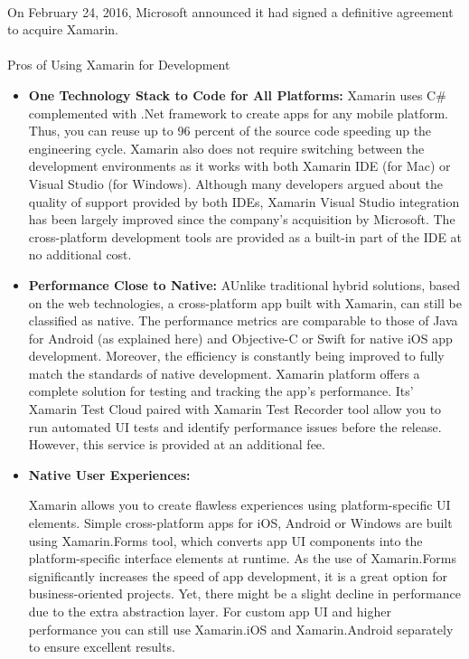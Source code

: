 \paragraph{}
On February 24, 2016, Microsoft announced it had signed a definitive agreement to acquire Xamarin.

\paragraph{}
Pros of Using Xamarin for Development


\begin{itemize}


 \item \textbf{One Technology Stack to Code for All Platforms:}
 Xamarin uses C\# complemented with .Net framework to create apps for any mobile platform. Thus, you can reuse up to 96 percent of the source code speeding up the engineering cycle. Xamarin also does not require switching between the development environments as it works with both Xamarin IDE (for Mac) or Visual Studio (for Windows). Although many developers argued about the quality of support provided by both IDEs, Xamarin Visual Studio integration has been largely improved since the company’s acquisition by Microsoft. The cross-platform development tools are provided as a built-in part of the IDE at no additional cost.


 \item \textbf{ Performance Close to Native:}  AUnlike traditional hybrid solutions, based on the web technologies, a cross-platform app built with Xamarin, can still be classified as native. The performance metrics are comparable to those of Java for Android (as explained here) and Objective-C or Swift for native iOS app development. Moreover, the efficiency is constantly being improved to fully match the standards of native development. Xamarin platform offers a complete solution for testing and tracking the app’s performance. Its’ Xamarin Test Cloud paired with Xamarin Test Recorder tool allow you to run automated UI tests and identify performance issues before the release. However, this service is provided at an additional fee.

 \item \textbf{Native User Experiences:}

 Xamarin allows you to create flawless experiences using platform-specific UI elements. Simple cross-platform apps for iOS, Android or Windows are built using Xamarin.Forms tool, which converts app UI components into the platform-specific interface elements at runtime. As the use of Xamarin.Forms significantly increases the speed of app development, it is a great option for business-oriented projects. Yet, there might be a slight decline in performance due to the extra abstraction layer. For custom app UI and higher performance you can still use Xamarin.iOS and Xamarin.Android separately to ensure excellent results.



\end{itemize}
